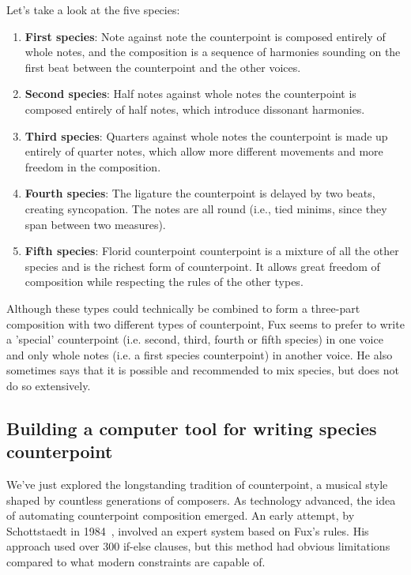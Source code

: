 Let's take a look at the five species:
\begin{enumerate}
    \item \textbf{First species}: Note against note \textendash{} the counterpoint is composed entirely of whole notes, and the composition is a sequence of harmonies sounding on the first beat between the counterpoint and the other voices.
    \item \textbf{Second species}: Half notes against whole notes \textendash{} the counterpoint is composed entirely of half notes, which introduce dissonant harmonies.
    \item \textbf{Third species}: Quarters against whole notes \textendash{} the counterpoint is made up entirely of quarter notes, which allow more different movements and more freedom in the composition.
    \item \textbf{Fourth species}: The ligature \textendash{} the counterpoint is delayed by two beats, creating syncopation. The notes are all round (i.e., tied minims, since they span between two measures).
    \item \textbf{Fifth species}: Florid counterpoint \textendash{} counterpoint is a mixture of all the other species and is the richest form of counterpoint. It allows great freedom of composition while respecting the rules of the other types.
\end{enumerate}

Although these types could technically be combined to form a three-part composition with two different types of counterpoint, Fux seems to prefer to write a 'special' counterpoint (i.e. second, third, fourth or fifth species) in one voice and only whole notes (i.e. a first species counterpoint) in another voice. He also sometimes says that it is possible and recommended to mix species, but does not do so extensively.

\subsection{Building a computer tool for writing species counterpoint}
We've just explored the longstanding tradition of counterpoint, a musical style shaped by countless generations of composers. As technology advanced, the idea of automating counterpoint composition emerged. An early attempt, by Schottstaedt in 1984~\cite{bill1984}, involved an expert system based on Fux's rules. His approach used over 300 if-else clauses, but this method had obvious limitations compared to what modern constraints are capable of.

